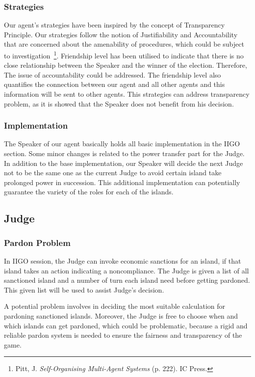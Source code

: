 \subsubsection{Strategies} \label{subsubsec:Team6_Speaker:Strategies}
Our agent's strategies have been inspired by the concept of Transparency Principle. Our strategies follow the notion of Justifiability and Accountability that are concerned about the amenability of procedures, which could be subject to investigation~\footnote{Pitt, J. \textit{Self-Organising Multi-Agent Systems} (p. 222). IC Press.}. Friendship level has been utilised to indicate that there is no close relationship between the Speaker and the winner of the election. Therefore, The issue of accountability could be addressed. The friendship level also quantifies the connection between our agent and all other agents and this information will be sent to other agents. This strategies can address transparency problem, as it is showed that the Speaker does not benefit from his decision.

\subsubsection{Implementation} \label{subsubsec:Team6_Speaker:Implementation}
The Speaker of our agent basically holds all basic implementation in the IIGO section. Some minor changes is related to the power transfer part for the Judge. In addition to the base implementation, our Speaker will decide the next Judge not to be the same one as the current Judge to avoid certain island take prolonged power in succession. This additional implementation can potentially guarantee the variety of the roles for each of the islands.

\subsection{Judge} \label{subsec:Team6_Judge}
\subsubsection{Pardon Problem} \label{subsubsec:Team6_Judge:Problem}
In IIGO session, the Judge can invoke economic sanctions for an island, if that island takes an action indicating a noncompliance. The Judge is given a list of all sanctioned island and a number of turn each island need before getting pardoned. This given list will be used to assist Judge's decision.

A potential problem involves in deciding the most suitable calculation for pardoning sanctioned islands. Moreover, the Judge is free to choose when and which islands can get pardoned, which could be problematic, because a rigid and reliable pardon system is needed to ensure the fairness and transparency of the game.

